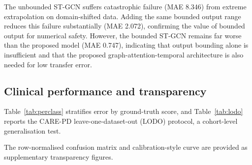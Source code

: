 \documentclass[preprint,12pt]{elsarticle}
\begin{document}
The unbounded ST-GCN suffers catastrophic failure (MAE 8.346) from extreme
extrapolation on domain-shifted data. Adding the same bounded output range
reduces this failure substantially (MAE 2.072), confirming the value of bounded
output for numerical safety. However, the bounded ST-GCN remains far worse than
the proposed model (MAE 0.747), indicating that output bounding alone is
insufficient and that the proposed graph-attention-temporal architecture is also
needed for low transfer error.

\subsection{Clinical performance and transparency}
\label{sec:perclass}
Table~\ref{tab:perclass} stratifies error by ground-truth score, and
Table~\ref{tab:lodo} reports the CARE-PD leave-one-dataset-out (LODO)
protocol, a cohort-level generalisation test.

\begin{table}[htpb]
\centering
\caption{Per-class error and per-class F1 on the combined CNUH+CARE-PD cohort
(GroupKFold 5-fold, $N=6{,}087$).}
\label{tab:perclass}
\end{table}
The row-normalised confusion matrix and calibration-style curve are provided as
supplementary transparency figures.

\begin{table}[htpb]
\centering
\caption{CARE-PD leave-one-dataset-out (LODO) results. Each row holds out one
source cohort; Overall aggregates all held-out sequences.}
\label{tab:lodo}
\end{table}
\end{document}
